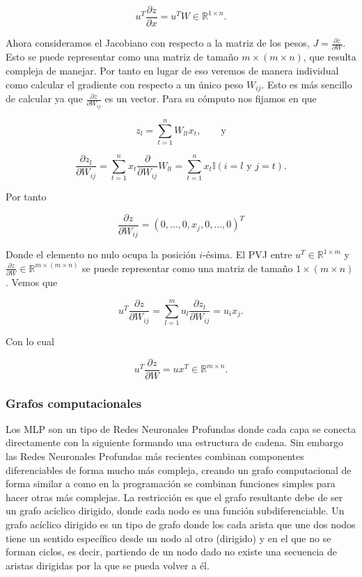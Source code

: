 $$u^T \frac{\partial z}{\partial x} = u^T W \in \mathbb{R}^{1 \times n}.$$

Ahora consideramos el Jacobiano con respecto a la matriz de los pesos, $J=\frac{\partial z}{\partial W}$. Esto se puede representar como una matriz de tamaño $m \times (m \times n)$, que resulta compleja de manejar. Por tanto en lugar de eso veremos de manera individual como calcular el gradiente con respecto a un único peso $W_{ij}$. Esto es más sencillo de calcular ya que $\frac{\partial z}{\partial W_{ij}}$ es un vector. Para su cómputo nos fijamos en que 

$$z_l = \sum_{t=1}^n W_{lt}x_t, \qquad \textrm{y}$$

$$\frac{\partial z_l}{\partial W_{ij}} = \sum_{t=1}^n x_t \frac{\partial}{\partial W_{ij}} W_{lt} = \sum_{t=1}^n x_t \mathbb{I}(i=l \textrm{ y } j=t) .$$

Por tanto

$$\frac{\partial z}{\partial W_{ij}} = \left ( 0, \ldots, 0, x_j,  0, \ldots, 0 \right )^T$$

Donde el elemento no nulo ocupa la posición $i$-ésima. El PVJ entre $u^T \in \mathbb{R}^{1 \times m}$ y $\frac{\partial z}{\partial W} \in \mathbb{R}^{m \times ( m \times n)}$ se puede representar como una matriz de tamaño $1 \times (m \times n)$. Vemos que 

$$u^T \frac{\partial z}{\partial W_{ij}}= \sum_{l=1}^m u_l \frac{\partial z_l}{\partial W_{ij}} = u_i x_j.$$

Con lo cual

$$ u^T \frac{\partial z}{\partial W}  = ux^T \in \mathbb{R}^{m \times n}.$$



\subsubsection{Grafos computacionales}

Los MLP son un tipo de Redes Neuronales Profundas donde cada capa se conecta directamente con la siguiente formando una estructura de cadena. Sin embargo las Redes Neuronales Profundas más recientes combinan componentes diferenciables de forma mucho más compleja, creando un grafo computacional de forma similar a como en la programación se combinan funciones simples para hacer otras más complejas. La restricción es que el grafo resultante debe de ser un grafo acíclico dirigido, donde cada nodo es una función subdiferenciable. Un grafo acíclico dirigido es un tipo de grafo donde los cada arista que une dos nodos tiene un sentido específico desde un nodo al otro (dirigido) y en el que no se forman ciclos, es decir, partiendo de un nodo dado no existe una secuencia de aristas dirigidas por la que se pueda volver a él.



